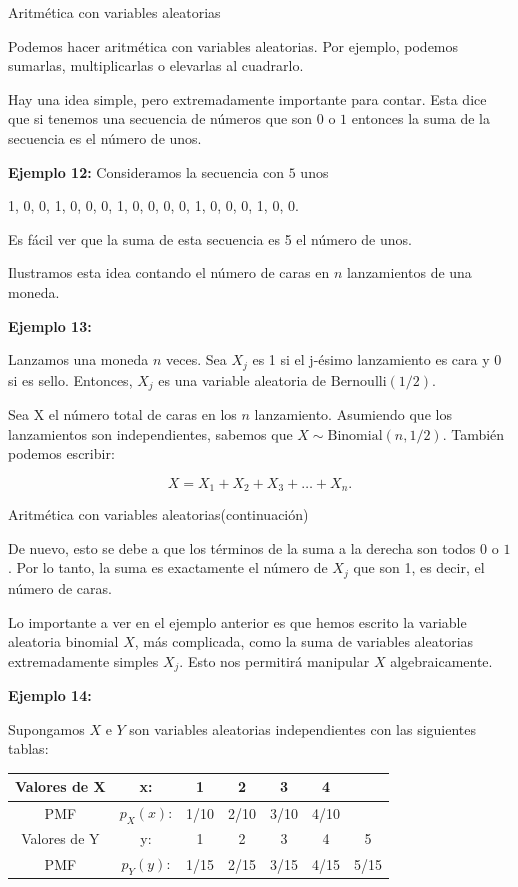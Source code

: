 \documentclass[10pt]{beamer}
\begin{document}
\begin{frame}{Aritm\'etica con variables aleatorias}
	
\small{Podemos hacer aritm\'etica con variables aleatorias. Por ejemplo, podemos sumarlas, multiplicarlas o elevarlas al cuadrarlo.

Hay una idea simple, pero extremadamente importante para contar. Esta dice que si tenemos una secuencia de n\'umeros que son $0$ o $1$ entonces la suma de la secuencia es el n\'umero de unos.}


\scriptsize{\textbf{Ejemplo 12:}
Consideramos la secuencia con $5$ unos

1, 0, 0, 1, 0, 0, 0, 1, 0, 0, 0, 0, 1, 0, 0, 0, 1, 0, 0.

Es f\'acil ver que la suma de esta secuencia es 5 el n\'umero de unos.

Ilustramos esta idea contando el n\'umero de caras en $n$ lanzamientos de una moneda.}

\textbf{Ejemplo 13:}

\scriptsize{Lanzamos una moneda $n$ veces. Sea $X_j$ es 1 si el j-\'esimo lanzamiento es cara y $0$ si es sello. Entonces, $X_j$ es una variable aleatoria de $\text{Bernoulli}(1/2)$.

Sea X el n\'umero total de caras en los $n$ lanzamiento. Asumiendo que  los lanzamientos son independientes, sabemos que  $X \sim \text{Binomial}(n, 1/2)$. Tambi\'en podemos escribir:

\[
X = X_1 +X_2 +X_3 + \dots + X_n.
\]
}
\end{frame}

\begin{frame}{Aritm\'etica con variables aleatorias(continuaci\'on)}
\small{De nuevo, esto se debe a que los t\'erminos de la suma a la derecha son todos $0$ o $1$. Por lo tanto, la suma es exactamente el n\'umero de $X_j$ que son 1, es decir, el n\'umero de caras.
	
Lo importante a ver en el ejemplo anterior es que hemos escrito la variable aleatoria binomial $X$, m\'as complicada, como la suma de variables aleatorias extremadamente simples $X_j$.  Esto nos permitir\'a manipular $X$ algebraicamente.

\textbf{Ejemplo 14:}

Supongamos $X$ e $Y$ son variables aleatorias independientes con las siguientes tablas:


\begin{table}[]
	\centering
	\begin{tabular}{c|c c c c c c}
		Valores de  X & x:       & 1    & 2    & 3    & 4  &   \\ \hline
		PMF           & $p_X(x)$: & 1/10 & 2/10 & 3/10 & 4/10 \\ 
		Valores de Y  & y:       & 1    & 2    & 3    & 4   & 5  \\ \hline
		PMF           & $p_Y(y)$:   & 1/15 & 2/15 & 3/15 & 4/15 & 5/15 \\ 
	\end{tabular}
\end{table}
}
\end{frame}
\end{document}
